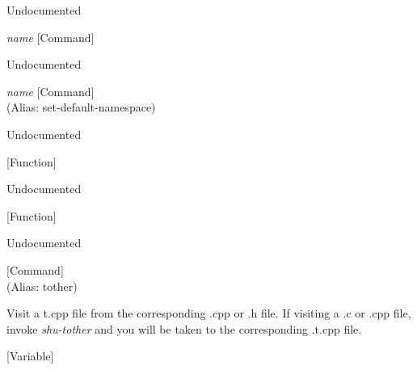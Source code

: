 \begin{doc-string}
Undocumented
\end{doc-string}

\vspace{1em}
\noindent
{}
\usebox{\funcname}\emph{name}
 \hfill [Command]

\begin{doc-string}
Undocumented
\end{doc-string}

\vspace{1em}
\noindent
{}
\usebox{\funcname}\emph{name}
 \hfill [Command]\\%
 (Alias: set-default-namespace)

\begin{doc-string}
Undocumented
\end{doc-string}

\vspace{1em}
\noindent
{}
\usebox{\funcname}
 \hfill [Function]

\begin{doc-string}
Undocumented
\end{doc-string}

\vspace{1em}
\noindent
{}
\usebox{\funcname}
 \hfill [Function]

\begin{doc-string}
Undocumented
\end{doc-string}

\vspace{1em}
\noindent
{}
\usebox{\funcname}
 \hfill [Command]\\%
 (Alias: tother)

\begin{doc-string}
Visit a t.cpp file from the corresponding .cpp or .h file.  If visiting a .c or
.cpp file, invoke \emph{shu-tother} and you will be taken to the corresponding .t.cpp
file.
\end{doc-string}

\vspace{1em}
\noindent
{}
\usebox{\funcname}
 \hfill [Variable]

